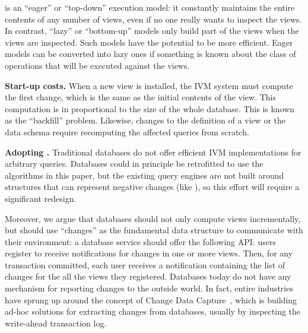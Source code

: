 \dbsp is an ``eager'' or ``top-down'' execution model: it constantly
maintains the entire contents of any number of views, even if no one
really wants to inspect the views.  In contrast, ``lazy'' or
``bottom-up'' models only build part of the views when the views are
inspected.  Such models have the potential to be more efficient.
Eager models can be converted into lazy ones if something is known
about the class of operations that will be executed against the views.

\textbf{Start-up costs.}  When a new view is installed, the IVM system
must compute the first change, which is the same as the initial
contents of the view.  This computation is in proportional to the size
of the whole database.  This is known as the ``backfill'' problem.
Likewise, changes to the definition of a view or the data schema
require recomputing the affected queries from scratch.

\textbf{Adopting \dbsp.} Traditional databases do not offer efficient
IVM implementations for arbitrary queries.  Databases could in
principle be retrofitted to use the algorithms in this paper, but the
existing query engines are not built around structures that can
represent negative changes (like \zrs), so this effort will require a
significant redesign.

Moreover, we argue that databases should not only compute views
incrementally, but should use ``changes'' as the fundamental data
structure to communicate with their environment: a database service
should offer the following API: users register to receive
notifications for changes in one or more views.  Then, for any
transaction committed, each user receives a notification containing
the list of changes for the all the views they registered.  Databases
today do not have any mechanism for reporting changes to the outside
world.  In fact, entire industries have sprung up around the concept
of Change Data Capture~\cite{cdc}, which is building ad-hoc solutions
for extracting changes from databases, usually by inspecting the
write-ahead transaction log.

